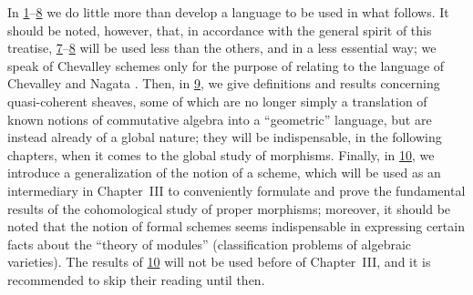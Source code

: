 In \textsection\textsection\hyperref[section:I.1]{1}--\hyperref[section:I.8]{8} we do little more than develop a language to be used in what follows.
It should be noted, however, that, in accordance with the general spirit of this treatise, \textsection\textsection\hyperref[section:I.7]{7}--\hyperref[section:I.8]{8} will be used less than the others, and in a less essential way; we speak of Chevalley schemes only for the purpose of relating to the language of Chevalley \cite{I-1} and Nagata \cite{I-9}.
Then, in \textsection\hyperref[section:I.9]{9}, we give definitions and results concerning quasi-coherent sheaves, some of which are no longer simply a translation of known notions of commutative algebra into a ``geometric'' language, but are instead already of a global nature; they will be indispensable, in the following chapters, when it comes to the global study of morphisms.
Finally, in \textsection\hyperref[section:I.10]{10}, we introduce a generalization of the notion of a scheme, which will be used as an intermediary in Chapter~III to conveniently formulate and prove the fundamental results of the cohomological study of proper morphisms;
moreover, it should be noted that the notion of formal schemes seems indispensable in expressing certain facts about the ``theory of modules'' (classification problems of algebraic varieties).
The results of \textsection\hyperref[section:I.10]{10} will not be used before  of Chapter~III, and it is recommended to skip their reading until then.
\bigskip












\nocite{I-1,I-2,I-3,I-4,I-5,I-6,I-7,I-8,I-9,I-10,I-11,I-12,I-13,I-14,I-15,I-16,I-17,I-18,I-19,I-20,I-21,I-22}







